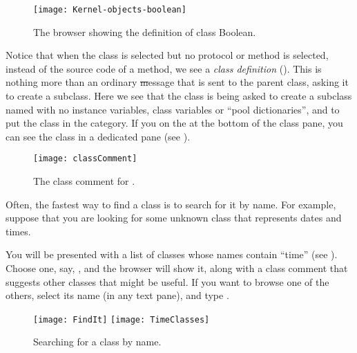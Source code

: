 \documentclass[a4paper,10pt,twoside]{book}
\begin{document}

\begin{figure}[hbt]
\centerline {\texttt{[image: Kernel-objects-boolean]}}
\caption{The browser showing the definition of class Boolean.
}
\end{figure}

Notice that when the  class is selected but no protocol or method is selected, instead of the source code of a method, we see a \emph{class definition} ().
This is nothing more than an ordinary \st message that is sent to the parent class, asking it to create a subclass.
Here we see that the class  is being asked to create a subclass named  with no instance variables, class variables or ``pool dictionaries'', and to put the class  in the  category.
If you \click on the  at the bottom of the class pane, you can see the class  in a dedicated pane (see ).

\begin{figure}[hbt]
\centerline {\texttt{[image: classComment]}}
\caption{The class comment for .
}
\end{figure}

Often, the fastest way to find a class is to search for it by name.  For example, suppose that you are looking for some unknown class that represents dates and times.

\noindent
You will be presented with a list of classes whose names contain ``time'' (see ).  Choose one, say, , and the browser will show it, along with a class comment that suggests other classes that might be useful.  If you want to browse one of the others, select its name (in any text pane), and type .

\begin{figure}[hbt]
\centerline{
	\texttt{[image: FindIt]}
	\hspace{1cm}
	\texttt{[image: TimeClasses]}
}
\caption{Searching for a class by name.
}
\end{figure}
\end{document}
